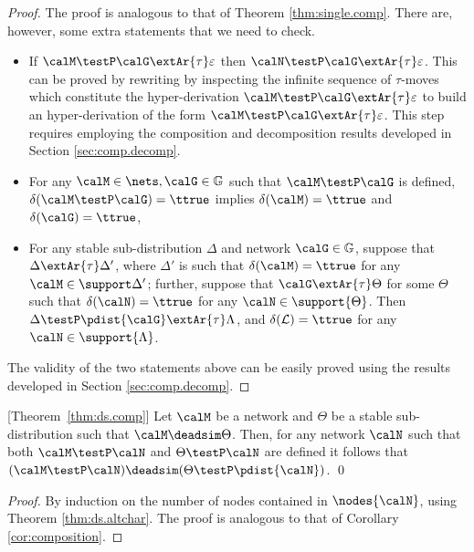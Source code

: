 \documentclass{LMCS}
\newcommand{\calL}{\ensuremath{{\mathcal{L}}}}
\begin{document}
\begin{proof}
The proof is analogous to that of Theorem \ref{thm:single.comp}.
There are, however, some extra statements that we need to 
check. 

\begin{itemize}
\item If $\calM \testP \calG \extAr{\tau} \varepsilon$ 
then $\calN \testP \calG \extAr{\tau} \varepsilon$. 
This can be proved by rewriting  
by inspecting the infinite 
sequence of $\tau$-moves which constitute the 
hyper-derivation $\calM \testP \calG \extAr{\tau} \varepsilon$ 
to build an hyper-derivation of the form $\calM \testP \calG \extAr{\tau} 
\varepsilon$. This step requires employing the composition and 
decomposition results developed in Section \ref{sec:comp.decomp}.

\item For any $\calM \in \nets, \calG \in \mathbb{G}$ such that 
$\calM \testP \calG$ is defined,  $\delta(\calM \testP \calG) = \ttrue$ 
implies $\delta(\calM) = \ttrue$ and $\delta(\calG) = \ttrue$,
\item For any stable sub-distribution $\Delta$ and network $\calG \in \mathbb{G}$, 
suppose that $\Delta \extAr{\tau} \Delta'$, where $\Delta'$ is such that 
$\delta(\calM) = \ttrue$ for any $\calM \in \support \Delta'$; further, 
suppose that  
$\calG \extAr{\tau} \Theta$ for some $\Theta$ such that 
$\delta(\calN) = \ttrue$ for any $\calN \in \support{\Theta}$. 
Then $\Delta \testP \pdist{\calG} \extAr{\tau} \Lambda$, and 
$\delta(\calL) = \ttrue$ for any $\calN \in \support{\Lambda}$.
\end{itemize}
The validity of the two statements above can be easily proved 
using the results developed in Section \ref{sec:comp.decomp}.
\end{proof}

\begin{cor}
\label{cor:ds.comp}[Theorem~\ref{thm:ds.comp}]
Let $\calM$ be a network and $\Theta$ be a stable sub-distribution 
such that $\calM \deadsim \Theta$. Then, for any network $\calN$ such 
that both $\calM \testP \calN$ and $\Theta \testP \calN$ are defined 
it follows that $(\calM \testP \calN) \deadsim (\Theta \testP \pdist{\calN})$.
\qed
\end{cor}
\begin{proof}
By induction on the number of nodes contained in 
$\nodes{\calN}$, using Theorem 
\ref{thm:ds.altchar}. The proof is analogous to that of Corollary \ref{cor:composition}.
\end{proof}
\end{document}
